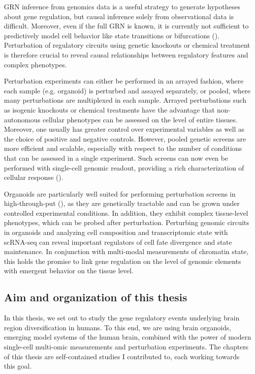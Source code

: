 GRN inference from genomics data is a useful strategy to generate hypotheses about gene regulation, but causal inference solely from observational data is difficult. Moreover, even if the full GRN is known, it is currently not sufficient to predictively model cell behavior like state transitions or bifurcations (\cite{teschendorff_statistical_2021}). Perturbation of regulatory circuits using genetic knockouts or chemical treatment is therefore crucial to reveal causal relationships between regulatory features and complex phenotypes.

Perturbation experiments can either be performed in an arrayed fashion, where each sample (e.g. organoid) is perturbed and assayed separately, or pooled, where many perturbations are multiplexed in each sample. Arrayed perturbations such as isogenic knockouts or chemical treatments have the advantage that non-autonomous cellular phenotypes can be assessed on the level of entire tissues. Moreover, one usually has greater control over experimental variables as well as the choice of positive and negative controls. However, pooled genetic screens are more efficient and scalable, especially with respect to the number of conditions that can be assessed in a single experiment. Such screens can now even be performed with single-cell genomic readout, providing a rich characterization of cellular response (\cite{dixit_perturb-seq_2016,datlinger_pooled_2017,jaitin_dissecting_2016}). 

Organoids are particularly well suited for performing perturbation screens in high-through-put (\cite{camp_mapping_2019}), as they are genetically tractable and can be grown under controlled experimental conditions. In addition, they exhibit complex tissue-level phenotypes, which can be probed after perturbation. Perturbing genomic circuits in organoids and analyzing cell composition and transcriptomic state with scRNA-seq can reveal important regulators of cell fate divergence and state maintenance. In conjunction with multi-modal measurements of chromatin state, this holds the promise to link gene regulation on the level of genomic elements with emergent behavior on the tissue level.



\subsection{Aim and organization of this thesis}

In this thesis, we set out to study the gene regulatory events underlying brain region diversification in humans. To this end, we are using brain organoids, emerging model systems of the human brain, combined with the power of modern single-cell multi-omic measurements and perturbation experiments. 
The chapters of this thesis are self-contained studies I contributed to, each working towards this goal.

